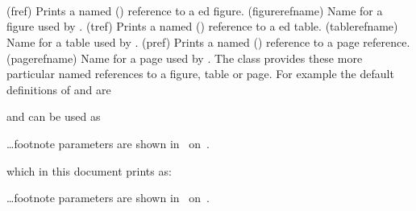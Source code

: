 \begin{syntax}
\cmd{\fref} \cmd{\figurerefname} \\
\cmd{\tref} \cmd{\tablerefname} \\
\cmd{\pref}  \\
\end{syntax}
\glossary(fref)%
  {}%
  {Prints a named () reference to a ed figure.}
\glossary(figurerefname)%
  {}%
  {Name for a figure used by .}
\glossary(tref)%
  {}%
  {Prints a named () reference to a ed table.}
\glossary(tablerefname)%
  {}%
  {Name for a table used by .}
\glossary(pref)%
  {}%
  {Prints a named () reference to a  page reference.}
\glossary(pagerefname)%
  {}%
  {Name for a page used by .}
    The class provides these more particular named 
references to a figure,
table or 
page. For example the 
default definitions of \cmd{\fref} and 
\cmd{\pref} are
\begin{lcode}
\newcommand{\fref}[1]{\figurerefname~\ref{#1}}
\newcommand{\pref}[1]{\pagerefname~\pageref{#1}}
\end{lcode}
and can be used as 
\begin{lcode}
\ldots footnote parameters are shown in~ 
on~.
\end{lcode}
which in this document prints as: 
\begin{syntax}
\ldots footnote parameters are shown in~ on~. \\
\end{syntax}

